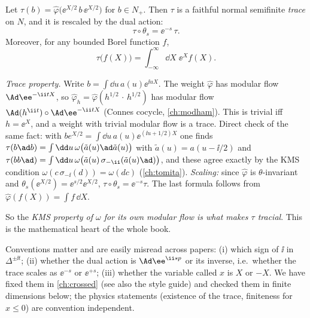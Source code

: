 \begin{theorem}\label{thm:trace}
Let $\tau(b)=\hat\varphi\big(\ee^{X/2}\,b\,\ee^{X/2}\big)$ for $b\in N_+$. Then $\tau$ is a faithful normal semifinite \emph{trace} on $N$, and it is rescaled by the dual action:
\begin{equation}
\tau\circ\theta_s=\ee^{-s}\,\tau.
\end{equation}
Moreover, for any bounded Borel function $f$,
\begin{equation}
\tau\big(f(X)\big)=\int_{-\infty}^\infty\dd X\;\ee^{X}f(X).
\end{equation}
\end{theorem}

\begin{proofsketch}
\emph{Trace property.} Write $b=\int\dd u\,a(u)\ee^{\ii uX}$. The weight $\hat\varphi$ has modular flow $\Ad\ee^{-\ii tX}$, so $\hat\varphi_h=\hat\varphi(h^{1/2}\,\cdot\,h^{1/2})$ has modular flow $\Ad(h^{\ii t})\circ\Ad\ee^{-\ii tX}$ (Connes cocycle, \cref{ch:modham}). This is trivial iff $h=\ee^{X}$, and a weight with trivial modular flow is a trace. Direct check of the same fact: with $b e^{X/2}=\int\dd u\,a(u)\ee^{(\ii u+1/2)X}$ one finds $\tau(b\ad b)=\int\dd u\,\omega\big(\tilde a(u)\ad\tilde a(u)\big)$ with $\tilde a(u)=a(u-\ii/2)$ and $\tau(bb\ad)=\int\dd u\,\omega\big(\tilde a(u)\,\sigma_{-\ii}(\tilde a(u)\ad)\big)$, and these agree exactly by the KMS condition $\omega(c\,\sigma_{-\ii}(d))=\omega(dc)$ (\cref{ch:tomita}). \emph{Scaling:} since $\hat\varphi$ is $\theta$-invariant and $\theta_s(\ee^{X/2})=\ee^{s/2}\ee^{X/2}$, $\tau\circ\theta_s=\ee^{-s}\tau$. The last formula follows from $\hat\varphi(f(X))=\int f\,\dd X$.
\end{proofsketch}

So the \emph{KMS property of $\omega$ for its own modular flow is what makes $\tau$ tracial}. This is the mathematical heart of the whole book.

\begin{whatwrong}
Conventions matter and are easily misread across papers: (i) which sign of $\ii$ in $\Delta^{\pm\ii t}$; (ii) whether the dual action is $\Ad\ee^{\ii sp}$ or its inverse, i.e.\ whether the trace scales as $\ee^{-s}$ or $\ee^{+s}$; (iii) whether the variable called $x$ is $X$ or $-X$. We have fixed them in \cref{ch:crossed} (see also the style guide) and checked them in finite dimensions below; the physics statements (existence of the trace, finiteness for $x\le0$) are convention independent.
\end{whatwrong}

